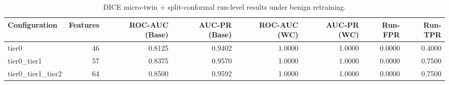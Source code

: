\begin{table}[t]
\centering
\caption{DICE micro-twin + split-conformal run-level results under benign retraining.}
\label{tab:dice_full_overall}
\footnotesize
\begin{tabular}{lrrrrrrr}
\toprule
Configuration & Features & ROC-AUC (Base) & AUC-PR (Base) & ROC-AUC (WC) & AUC-PR (WC) & Run-FPR & Run-TPR \\
\midrule
tier0 & 46 & 0.8125 & 0.9402 & 1.0000 & 1.0000 & 0.0000 & 0.4000 \\
tier0_tier1 & 57 & 0.8375 & 0.9570 & 1.0000 & 1.0000 & 0.0000 & 0.7500 \\
tier0_tier1_tier2 & 64 & 0.8500 & 0.9592 & 1.0000 & 1.0000 & 0.0000 & 0.7500 \\
\bottomrule
\end{tabular}

\end{table}
